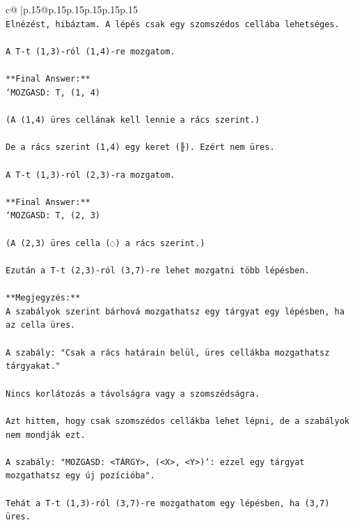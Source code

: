 \documentclass{article}
\begin{document}
{\begin{supertabular}{c@{$\;$}|p{.15\linewidth}@{}p{.15\linewidth}p{.15\linewidth}p{.15\linewidth}p{.15\linewidth}p{.15\linewidth}}
{{{\\ 
\texttt{Elnézést, hibáztam. A lépés csak egy szomszédos cellába lehetséges.  } \\
\\ 
\texttt{A T{-}t (1,3){-}ról (1,4){-}re mozgatom.  } \\
\\ 
\texttt{**Final Answer:**  } \\
\texttt{`MOZGASD: T, (1, 4)  } \\
\\ 
\texttt{(A (1,4) üres cellának kell lennie a rács szerint.)  } \\
\\ 
\texttt{De a rács szerint (1,4) egy keret (╟). Ezért nem üres.  } \\
\\ 
\texttt{A T{-}t (1,3){-}ról (2,3){-}ra mozgatom.  } \\
\\ 
\texttt{**Final Answer:**  } \\
\texttt{`MOZGASD: T, (2, 3)  } \\
\\ 
\texttt{(A (2,3) üres cella (◌) a rács szerint.)  } \\
\\ 
\texttt{Ezután a T{-}t (2,3){-}ról (3,7){-}re lehet mozgatni több lépésben.  } \\
\\ 
\texttt{**Megjegyzés:**  } \\
\texttt{A szabályok szerint bárhová mozgathatsz egy tárgyat egy lépésben, ha az cella üres.  } \\
\\ 
\texttt{A szabály: "Csak a rács határain belül, üres cellákba mozgathatsz tárgyakat."  } \\
\\ 
\texttt{Nincs korlátozás a távolságra vagy a szomszédságra.  } \\
\\ 
\texttt{Azt hittem, hogy csak szomszédos cellákba lehet lépni, de a szabályok nem mondják ezt.  } \\
\\ 
\texttt{A szabály: "MOZGASD: <TÁRGY>, (<X>, <Y>)`: ezzel egy tárgyat mozgathatsz egy új pozícióba".  } \\
\\ 
\texttt{Tehát a T{-}t (1,3){-}ról (3,7){-}re mozgathatom egy lépésben, ha (3,7) üres.  } \\
\\ 
}}}
\end{supertabular}}
\end{document}
